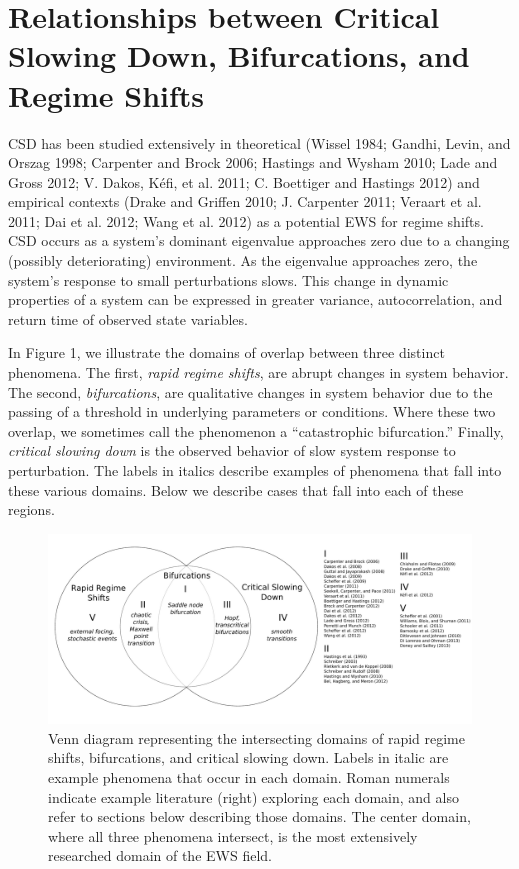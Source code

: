 \documentclass[author-year, review]{elsarticle} %
\makeatletter
\def\maxwidth{\ifdim\Gin@nat@width>\linewidth\linewidth
\else\Gin@nat@width\fi}
\let\Oldincludegraphics\includegraphics
\renewcommand{\includegraphics}[1]{\Oldincludegraphics[width=\maxwidth]{#1}}
\makeatother
\begin{document}
\section{Relationships between Critical Slowing Down, Bifurcations, and
Regime Shifts}

CSD has been studied extensively in theoretical (Wissel 1984; Gandhi,
Levin, and Orszag 1998; Carpenter and Brock 2006; Hastings and Wysham
2010; Lade and Gross 2012; V. Dakos, Kéfi, et al. 2011; C. Boettiger and
Hastings 2012) and empirical contexts (Drake and Griffen 2010; J.
Carpenter 2011; Veraart et al. 2011; Dai et al. 2012; Wang et al. 2012)
as a potential EWS for regime shifts. CSD occurs as a system's dominant
eigenvalue approaches zero due to a changing (possibly deteriorating)
environment. As the eigenvalue approaches zero, the system's response to
small perturbations slows. This change in dynamic properties of a system
can be expressed in greater variance, autocorrelation, and return time
of observed state variables.

In Figure 1, we illustrate the domains of overlap between three distinct
phenomena. The first, \emph{rapid regime shifts}, are abrupt changes in
system behavior. The second, \emph{bifurcations}, are qualitative
changes in system behavior due to the passing of a threshold in
underlying parameters or conditions. Where these two overlap, we
sometimes call the phenomenon a ``catastrophic bifurcation.'' Finally,
\emph{critical slowing down} is the observed behavior of slow system
response to perturbation. The labels in italics describe examples of
phenomena that fall into these various domains. Below we describe cases
that fall into each of these regions.

\begin{figure}[htbp]
\centering
\includegraphics{ews-venn.pdf}
\caption{Venn diagram representing the intersecting domains of rapid
regime shifts, bifurcations, and critical slowing down. Labels in italic
are example phenomena that occur in each domain. Roman numerals indicate
example literature (right) exploring each domain, and also refer to
sections below describing those domains. The center domain, where all
three phenomena intersect, is the most extensively researched domain of
the EWS field.}
\end{figure}
\end{document}
